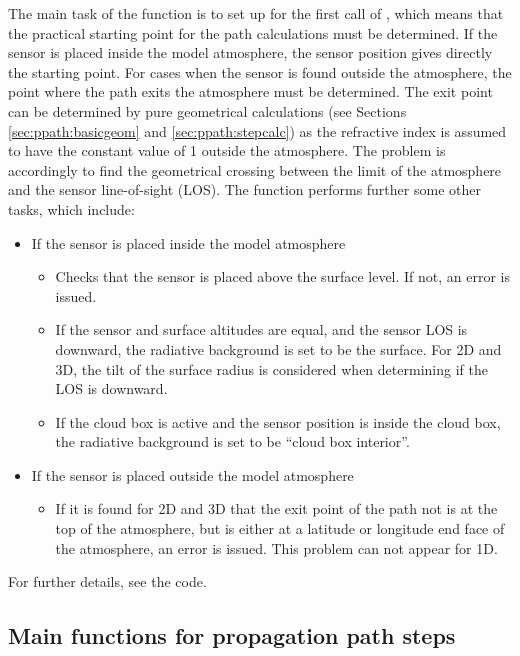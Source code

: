 The main task of the function  is to
set up  for the first call of
, which means that the practical
starting point for the path calculations must be determined. If the
sensor is placed inside the model atmosphere, the sensor position
gives directly the starting point. For cases when the sensor is found
outside the atmosphere, the point where the path exits the atmosphere
must be determined. The exit point can be determined by pure
geometrical calculations (see Sections \ref{sec:ppath:basicgeom} and
\ref{sec:ppath:stepcalc}) as the refractive index is assumed to have the
constant value of 1 outside the atmosphere. The problem is accordingly
to find the geometrical crossing between the limit of the atmosphere
and the sensor line-of-sight (LOS). The function performs further some
other tasks, which include:
\begin{itemize}
\item If the sensor is placed inside the model atmosphere
  \begin{itemize}
  \item Checks that the sensor is placed above the surface level. If
    not, an error is issued.
  \item If the sensor and surface altitudes are equal, and the sensor
    LOS is downward, the radiative background is set to be the
    surface. For 2D and 3D, the tilt of the surface radius is considered
    when determining if the LOS is downward.
  \item If the cloud box is active and the sensor position is inside
    the cloud box, the radiative background is set to be ``cloud box
    interior''. 
  \end{itemize}
\item If the sensor is placed outside the model atmosphere
  \begin{itemize}
  \item If it is found for 2D and 3D that the exit point of the path
    not is at the top of the atmosphere, but is either at a latitude
    or longitude end face of the atmosphere, an error is issued. This
    problem can not appear for 1D.
  \end{itemize}
\end{itemize}
For further details, see the code.


\subsection{Main functions for propagation path steps}

